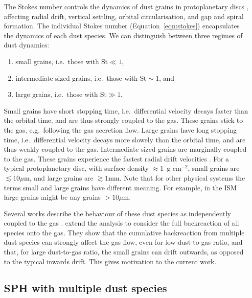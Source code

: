 \documentclass[fleqn,usenatbib]{mnras}
\begin{document}
The Stokes number controls the dynamics of dust grains in protoplanetary discs
\citep{Weidenschilling1977MNRAS.180...57W, Takeuchi2002ApJ...581.1344T},
affecting radial drift, vertical settling, orbital circularisation, and gap and
spiral formation. The individual Stokes number (Equation~\ref{eqn:stokes})
encapsulates the dynamics of each dust species. We can distinguish between three
regimes of dust dynamics:
%
\begin{enumerate}
   \item small grains, i.e.\ those with \(\mathrm{St} \ll 1\),
   \item intermediate-sized grains, i.e.\ those with \(\mathrm{St} \sim 1\), and
   \item large grains, i.e.\ those with \(\mathrm{St} \gg 1\).
\end{enumerate}
%
Small grains have short stopping time, i.e.\ differential velocity decays faster
than the orbital time, and are thus strongly coupled to the gas. These grains
stick to the gas, e.g.\ following the gas accretion flow. Large grains have long
stopping time, i.e.\ differential velocity decays more slowely than the orbital
time, and are thus weakly coupled to the gas. Intermediate-sized grains are
marginally coupled to the gas. These grains experience the fastest radial drift
velocities \citep{Takeuchi2002ApJ...581.1344T,Ayliffe2012MNRAS.423.1450A}. For a
typical protoplanetary disc, with surface density \(\approx 1\)~g cm\({}^{-2}\),
small grains are \(\lesssim 10 \mu\mathrm{m}\), and large grains are \(\gtrsim 1
\mathrm{mm}\). Note that for other physical systems the terms small and large
grains have different meaning. For example, in the ISM large grains might be any
grains \(> 10 \mu\mathrm{m}\).

Several works describe the behaviour of these dust species as independently
coupled to the gas \citep{Nakagawa1986Icar...67..375N,
Dipierro2017MNRAS.469.1932D, Kanagawa2017ApJ...844..142K}.
\citet{Dipierro2018MNRAS.479.4187D} extend the analysis to consider the full
backreaction of all species onto the gas. They show that the cumulative
backreaction from multiple dust species can strongly affect the gas flow, even
for low dust-to-gas ratio, and that, for large dust-to-gas ratio, the small
grains can drift outwards, as opposed to the typical inwards drift. This gives
motivation to the current work.


\subsection{SPH with multiple dust species}%
\label{subsec:sph}
\end{document}
